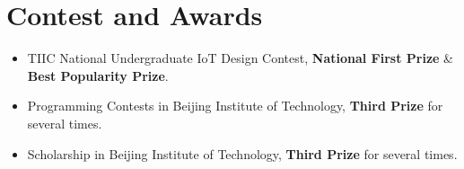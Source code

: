 \documentclass{resume}
\begin{document}
\section{Contest and Awards}
\begin{itemize}
  \item TIIC National Undergraduate IoT Design Contest, \textbf{National First Prize} \& \textbf{Best Popularity Prize}.
  \item Programming Contests in Beijing Institute of Technology, \textbf{Third Prize} for several times.
  \item Scholarship in Beijing Institute of Technology, \textbf{Third Prize} for several times.
\end{itemize}



\end{document}
